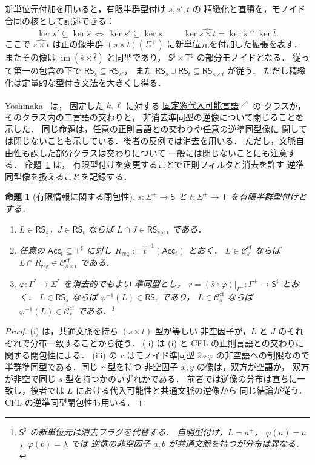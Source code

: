 \documentclass[11pt,a4paper]{ltjsarticle}
\newcommand{\fwdlink}[2]{%
  \hyperlink{#1}{#2\textsuperscript{\(\nearrow\)}}%
}
\newtheorem{proposition}[theorem]{命題}
\theoremstyle{remark}
\theoremstyle{plain}
\newcommand{\cf}{\mathrm{cf}}
\newcommand{\Ccf}[1]{\mathcal C_{#1}^{\cf}}
\begin{document}
新単位元付加を用いると，有限半群型付け $s,s',t$ の
精緻化と直積を，モノイド合同の核として記述できる：
\[
\ker\widehat{s'}\subseteq\ker\widehat s
\ \Longleftrightarrow\
\ker s'\subseteq\ker s,\qquad
\ker\widehat{s\times t}
=\ker\widehat s\cap\ker\widehat t.
\]
ここで $\widehat{s\times t}$ は正の像半群
$(s\times t)(\Sigma^+)$ に新単位元を付加した拡張を表す．
またその像は
$\operatorname{im}(\widehat s\times\widehat t)$ と同型であり，
$\mathsf S^\sharp\times\mathsf T^\sharp$ の部分モノイドとなる．
従って第一の包含の下で
$\mathsf{RS}_s\subseteq\mathsf{RS}_{s'}$，
また $\mathsf{RS}_s\cup\mathsf{RS}_t
\subseteq\mathsf{RS}_{s\times t}$ が従う．
ただし精緻化は定量的な型付き文法を大きくし得る．

Yoshinaka~\cite[Proposition~1]{yoshinaka2008} は，
固定した $k,\ell$ に対する
\fwdlink{def:kl-subst}{固定窓代入可能言語}の
クラスが，そのクラス内の二言語の交わりと，
非消去準同型の逆像について閉じることを示した．
同じ命題は，任意の正則言語との交わりや任意の逆準同型像に
関しては閉じないことも示している．後者の反例では消去を用いる．
ただし，文脈自由性も課した部分クラスは交わりについて
一般には閉じないことにも注意する．
命題~\ref{prop:finite-info-closure} は，
有限型付けを変更することで正則フィルタと消去を許す
逆準同型像を扱えることを記録する．

\begin{proposition}[有限情報に関する閉包性]\label{prop:finite-info-closure}
$s:\Sigma^+\to\mathsf S$ と
$t:\Sigma^+\to\mathsf T$ を有限半群型付けとする．
\begin{enumerate}[label=\textup{(\roman*)},nosep]
\item $L\in\mathsf{RS}_s$，$J\in\mathsf{RS}_t$ ならば
$L\cap J\in\mathsf{RS}_{s\times t}$ である．
\item 任意の $\mathsf{Acc}_t\subseteq\mathsf T^\sharp$ に対し
$R_{\mathrm{reg}}:=\widehat t^{-1}(\mathsf{Acc}_t)$ とおく．
$L\in\Ccf{s}$ ならば
$L\cap R_{\mathrm{reg}}\in\Ccf{s\times t}$ である．
\item $\varphi:\Gamma^*\to\Sigma^*$ を消去的でもよい
準同型とし，
$r=(\widehat s\circ\varphi)|_{\Gamma^+}:
\Gamma^+\to\mathsf S^\sharp$ とおく．
$L\in\mathsf{RS}_s$ ならば
$\varphi^{-1}(L)\in\mathsf{RS}_r$ であり，
$L\in\Ccf{s}$ ならば $\varphi^{-1}(L)\in\Ccf{r}$
である．\footnote{%
$\mathsf S^\sharp$ の新単位元は消去フラグを代替する．
自明型付け，$L=a^+$，
$\varphi(a)=a$，$\varphi(b)=\lambda$ では
逆像の非空因子 $a,b$ が共通文脈を持つが分布は異なる．}
\end{enumerate}
\end{proposition}
\begin{proof}
(i) は，共通文脈を持ち $(s\times t)$-型が等しい
非空因子が，$L$ と $J$ のそれぞれで分布一致することから従う．
(ii) は (i) と CFL の正則言語との交わりに関する閉包性による．
(iii) の $r$ はモノイド準同型
$\widehat s\circ\varphi$ の非空語への制限なので
半群準同型である．同じ $r$-型を持つ
非空因子 $x,y$ の像は，双方が空語か，
双方が非空で同じ $s$-型を持つかのいずれかである．
前者では逆像の分布は直ちに一致し，後者では
$L$ における代入可能性と共通文脈の逆像から
同じ結論が従う．CFL の逆準同型閉包性も用いる．
\end{proof}
\end{document}
